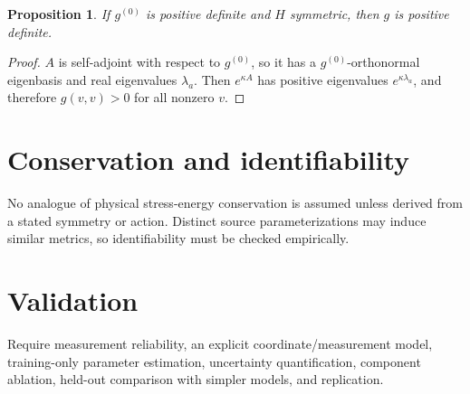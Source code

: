 \documentclass[11pt]{article}
\newtheorem{proposition}{Proposition}
\begin{document}
\begin{proposition}
If $g^{(0)}$ is positive definite and $H$ symmetric, then $g$ is positive definite.
\end{proposition}
\begin{proof}
$A$ is self-adjoint with respect to $g^{(0)}$, so it has a $g^{(0)}$-orthonormal eigenbasis and real eigenvalues $\lambda_a$. Then $e^{\kappa A}$ has positive eigenvalues $e^{\kappa\lambda_a}$, and therefore $g(v,v)>0$ for all nonzero $v$.
\end{proof}

\section{Conservation and identifiability}
No analogue of physical stress-energy conservation is assumed unless derived from a stated symmetry or action. Distinct source parameterizations may induce similar metrics, so identifiability must be checked empirically.

\section{Validation}
Require measurement reliability, an explicit coordinate/measurement model, training-only parameter estimation, uncertainty quantification, component ablation, held-out comparison with simpler models, and replication.
\end{document}
